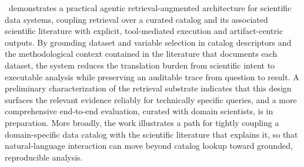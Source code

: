 \cmapagent\ demonstrates a practical agentic retrieval-augmented architecture for scientific data systems, coupling retrieval over a curated catalog and its associated scientific literature with explicit, tool-mediated execution and artifact-centric outputs.
By grounding dataset and variable selection in catalog descriptors and the methodological context contained in the literature that documents each dataset, the system reduces the translation burden from scientific intent to executable analysis while preserving an auditable trace from question to result.
A preliminary characterization of the retrieval substrate indicates that this design surfaces the relevant evidence reliably for technically specific queries, and a more comprehensive end-to-end evaluation, curated with domain scientists, is in preparation.
More broadly, the work illustrates a path for tightly coupling a domain-specific data catalog with the scientific literature that explains it, so that natural-language interaction can move beyond catalog lookup toward grounded, reproducible analysis.
